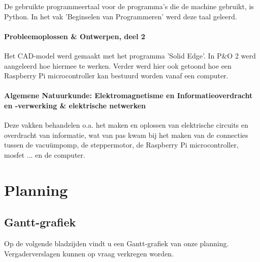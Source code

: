 \documentclass[a4paper,twoside,kulak]{kulakreport} %
\begin{document}
De gebruikte programmeertaal voor de programma's die de machine gebruikt, is Python. In het vak 'Beginselen van Programmeren' werd deze taal geleerd. 

\paragraph{Probleemoplossen \& Ontwerpen, deel 2}

Het CAD-model werd gemaakt met het programma 'Solid Edge'. In P\&O 2 werd aangeleerd hoe hiermee te werken. Verder werd hier ook getoond hoe een Raspberry Pi microcontroller kan bestuurd worden vanaf een computer. 

\paragraph{Algemene Natuurkunde: Elektromagnetisme en Informatieoverdracht en -verwerking \& elektrische netwerken}

Deze vakken behandelen o.a. het maken en oplossen van elektrische circuits en overdracht van informatie, wat van pas kwam bij het maken van de connecties tussen de vacuümpomp, de steppermotor, de Raspberry Pi microcontroller, mosfet ... en de computer.

\clearpage

\section*{Planning}
\subsection*{Gantt-grafiek}
Op de volgende bladzijden vindt u een Gantt-grafiek van onze planning. Vergaderverslagen kunnen op vraag verkregen worden.



\end{document}
